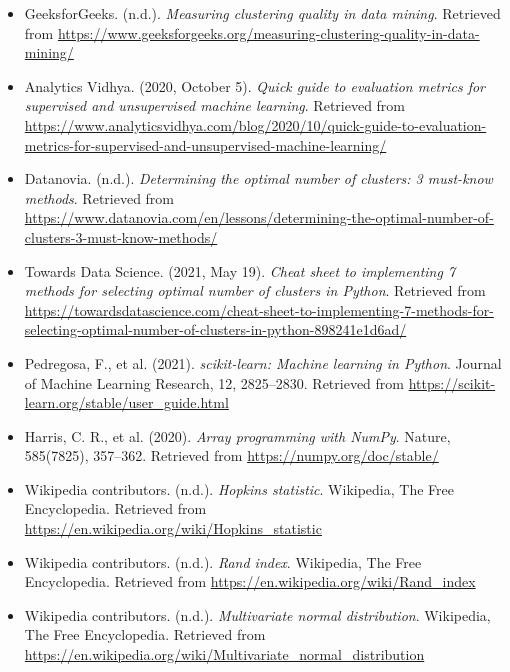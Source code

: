\documentclass[11pt,a4paper]{article}
\begin{document}
\begin{itemize}
    \item GeeksforGeeks. (n.d.). \textit{Measuring clustering quality in data mining}. Retrieved from \url{https://www.geeksforgeeks.org/measuring-clustering-quality-in-data-mining/}
    \item Analytics Vidhya. (2020, October 5). \textit{Quick guide to evaluation metrics for supervised and unsupervised machine learning}. Retrieved from \url{https://www.analyticsvidhya.com/blog/2020/10/quick-guide-to-evaluation-metrics-for-supervised-and-unsupervised-machine-learning/}
    \item Datanovia. (n.d.). \textit{Determining the optimal number of clusters: 3 must-know methods}. Retrieved from \url{https://www.datanovia.com/en/lessons/determining-the-optimal-number-of-clusters-3-must-know-methods/}
    \item Towards Data Science. (2021, May 19). \textit{Cheat sheet to implementing 7 methods for selecting optimal number of clusters in Python}. Retrieved from \url{https://towardsdatascience.com/cheat-sheet-to-implementing-7-methods-for-selecting-optimal-number-of-clusters-in-python-898241e1d6ad/}
    \item Pedregosa, F., et al. (2021). \textit{scikit-learn: Machine learning in Python}. Journal of Machine Learning Research, 12, 2825--2830. Retrieved from \url{https://scikit-learn.org/stable/user_guide.html}
    \item Harris, C. R., et al. (2020). \textit{Array programming with NumPy}. Nature, 585(7825), 357--362. Retrieved from \url{https://numpy.org/doc/stable/}
    \item Wikipedia contributors. (n.d.). \textit{Hopkins statistic}. Wikipedia, The Free Encyclopedia. Retrieved from \url{https://en.wikipedia.org/wiki/Hopkins_statistic}
    \item Wikipedia contributors. (n.d.). \textit{Rand index}. Wikipedia, The Free Encyclopedia. Retrieved from \url{https://en.wikipedia.org/wiki/Rand_index}
    \item Wikipedia contributors. (n.d.). \textit{Multivariate normal distribution}. Wikipedia, The Free Encyclopedia. Retrieved from \url{https://en.wikipedia.org/wiki/Multivariate_normal_distribution}
\end{itemize}
\end{document}
